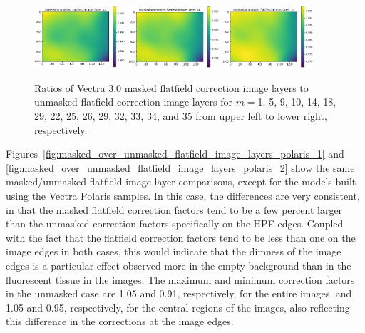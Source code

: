 \documentclass[letterpaper,11pt]{article}
\begin{document}
\begin{figure}[!ht]
\includegraphics[width=0.3\textwidth]{images/results/masked_over_unmasked_flatfield_image_layers_vectra/masked_over_unmasked_flatfield_image_layer_33}
\includegraphics[width=0.3\textwidth]{images/results/masked_over_unmasked_flatfield_image_layers_vectra/masked_over_unmasked_flatfield_image_layer_34}
\includegraphics[width=0.3\textwidth]{images/results/masked_over_unmasked_flatfield_image_layers_vectra/masked_over_unmasked_flatfield_image_layer_35}
\caption{\footnotesize Ratios of Vectra 3.0 masked flatfield correction image layers to unmasked flatfield correction image layers for $m=$1, 5, 9, 10, 14, 18, 29, 22, 25, 26, 29, 32, 33, 34, and 35 from upper left to lower right, respectively.}
\label{fig:masked_over_unmasked_flatfield_image_layers_vectra}
\end{figure}

Figures~\ref{fig:masked_over_unmasked_flatfield_image_layers_polaris_1} and \ref{fig:masked_over_unmasked_flatfield_image_layers_polaris_2} show the same masked/unmasked flatfield image layer comparisons, except for the models built using the Vectra Polaris samples. In this case, the differences are very consistent, in that the masked flatfield correction factors tend to be a few percent larger than the unmasked correction factors specifically on the HPF edges. Coupled with the fact that the flatfield correction factors tend to be less than one on the image edges in both cases, this would indicate that the dimness of the image edges is a particular effect observed more in the empty background than in the fluorescent tissue in the images. The maximum and minimum correction factors in the unmasked case are 1.05 and 0.91, respectively, for the entire images, and 1.05 and 0.95, respectively, for the central regions of the images, also reflecting this difference in the corrections at the image edges.
\end{document}
